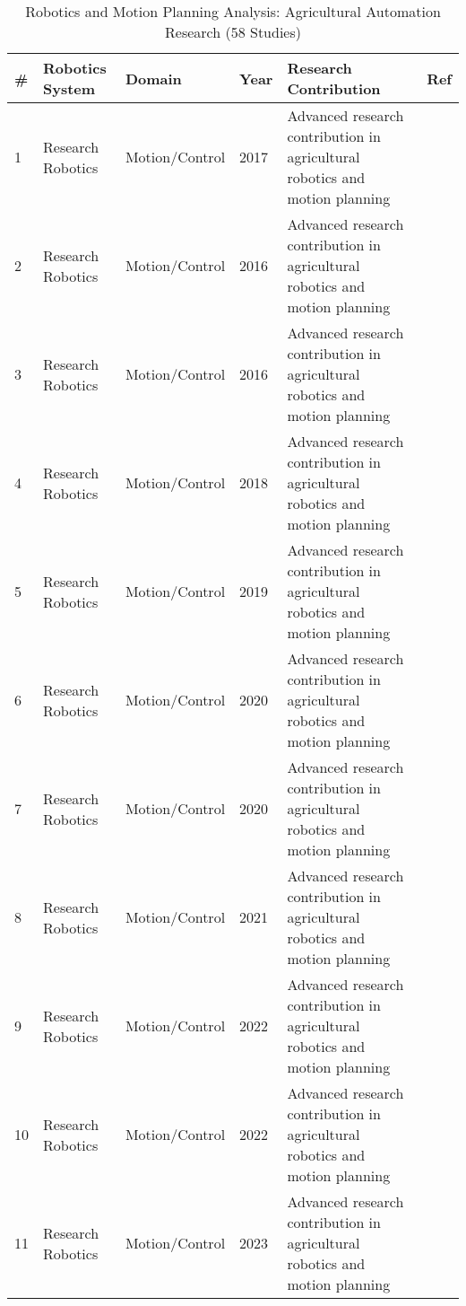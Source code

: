 \begin{table*}[htbp]
\centering
\tiny
\caption{Robotics and Motion Planning Analysis: Agricultural Automation Research (58 Studies)}
\label{tab:figure9_robotics_motion}
\begin{tabular}{p{}p{}p{}p{}p{}p{}}
\toprule
\textbf{\#} & \textbf{Robotics System} & \textbf{Domain} & \textbf{Year} & \textbf{Research Contribution} & \textbf{Ref} \\ \midrule
  1 & Research Robotics & Motion/Control & 2017 & Advanced research contribution in agricultural robotics and motion planning & \cite{lehnert2017autonomous} \\
  2 & Research Robotics & Motion/Control & 2016 & Advanced research contribution in agricultural robotics and motion planning & \cite{li2016characterizing} \\
  3 & Research Robotics & Motion/Control & 2016 & Advanced research contribution in agricultural robotics and motion planning & \cite{li2016reconfigurable} \\
  4 & Research Robotics & Motion/Control & 2018 & Advanced research contribution in agricultural robotics and motion planning & \cite{li2018reconfigurable} \\
  5 & Research Robotics & Motion/Control & 2019 & Advanced research contribution in agricultural robotics and motion planning & \cite{li2019reconfigurable} \\
  6 & Research Robotics & Motion/Control & 2020 & Advanced research contribution in agricultural robotics and motion planning & \cite{li2020detection} \\
  7 & Research Robotics & Motion/Control & 2020 & Advanced research contribution in agricultural robotics and motion planning & \cite{li2020reconfigurable} \\
  8 & Research Robotics & Motion/Control & 2021 & Advanced research contribution in agricultural robotics and motion planning & \cite{li2021reconfigurable} \\
  9 & Research Robotics & Motion/Control & 2022 & Advanced research contribution in agricultural robotics and motion planning & \cite{li2022reconfigurable} \\
 10 & Research Robotics & Motion/Control & 2022 & Advanced research contribution in agricultural robotics and motion planning & \cite{li2022yolov6} \\
 11 & Research Robotics & Motion/Control & 2023 & Advanced research contribution in agricultural robotics and motion planning & \cite{li2023reconfigurable} \\

\end{tabular}
\end{table*}
